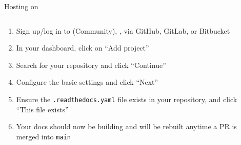 \begin{frame}[fragile]{Hosting on \rtd}
  \begin{columns}[onlytextwidth]
    \begin{column}{0.48\textwidth}
      \begin{enumerate}
        \setlength{\itemsep}{1em}
        \setcounter{enumi}{1}
      \item <1-> Sign up/log in to  (Community), \eg, via GitHub, GitLab, or Bitbucket
        \item <2-> In your dashboard, click on \enquote{Add project}
        \item <3-> Search for your repository and click \enquote{Continue}
        \item <4-> Configure the basic settings and click \enquote{Next}
        \item <5-> Ensure the \texttt{.readthedocs.yaml} file exists in your repository, and click \enquote{This file exists}
        \item <6-> Your docs should now be building and will be rebuilt anytime a PR is merged into \texttt{main}
      \end{enumerate}
    \end{column}
    \hfill
    \begin{column}{0.48\textwidth}
\end{column}
\end{columns}
\end{frame}
